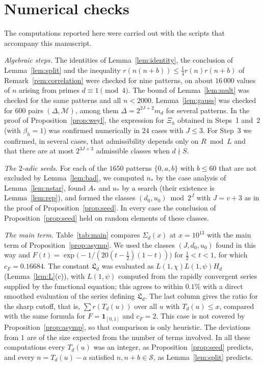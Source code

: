 \documentclass[11pt]{amsart}
\theoremstyle{remark}
\theoremstyle{definition}
\numberwithin{equation}{section}
\newcommand{\Sc}{\mathcal{S}}
\newcommand{\Lf}{\mathfrak{L}}
\begin{document}
\section{Numerical checks}\label{sec:numerics}

The computations reported here were carried out with the scripts that accompany this manuscript.

\emph{Algebraic steps.} The identities of Lemma~\ref{lem:identity}, the conclusion of Lemma~\ref{lem:split} and the inequality $r(n(n+b))\le\frac14r(n)r(n+b)$ of Remark~\ref{rem:correlation} were checked for nine patterns, on about $16\,000$ values of $n$ arising from primes $d\equiv1\pmod4$. The bound of Lemma~\ref{lem:mult} was checked for the same patterns and all $n<2000$. Lemma~\ref{lem:gauss} was checked for $600$ pairs $(\Delta,\mathcal M)$, among them $\Delta=2^{2J+2}m_d$ for several patterns. In the proof of Proposition~\ref{prop:weyl}, the expression for $\Xi_h$ obtained in Steps~1 and~2 (with $\beta_h=1$) was confirmed numerically in $24$ cases with $J\le3$. For Step~3 we confirmed, in several cases, that admissibility depends only on $R\bmod L$ and that there are at most $2^{3J+3}$ admissible classes when $d\nmid S$.

\emph{The $2$-adic seeds.} For each of the $1650$ patterns $\{0,a,b\}$ with $b\le60$ that are not excluded by Lemma~\ref{lem:bad}, we computed $n_*$ by the case analysis of Lemma~\ref{lem:nstar}, found $A_*$ and $u_*$ by a search (their existence is Lemma~\ref{lem:rep}), and formed the classes $(d_0,u_0)\bmod2^J$ with $J=v+3$ as in the proof of Proposition~\ref{prop:seed}. In every case the conclusion of Proposition~\ref{prop:seed} held on random elements of these classes.

\emph{The main term.} Table~\ref{tab:main} compares $\Sigma_d(x)$ at $x=10^{13}$ with the main term of Proposition~\ref{prop:asymp}. We used the classes $(J,d_0,u_0)$ found in this way and $F(t)=\exp\bigl(-1/(20(t-\frac12)(1-t))\bigr)$ for $\frac12<t<1$, for which $c_F=0.16684$. The constant $\Lf_d$ was evaluated as $L(1,\chi)L(1,\psi)H_d$ (Lemma~\ref{lem:L}(c)), with $L(1,\psi)$ computed from the rapidly convergent series supplied by the functional equation; this agrees to within $0.1\%$ with a direct smoothed evaluation of the series defining $\Lf_d$. The last column gives the ratio for the sharp cutoff, that is, $\sum r(T_d(u))$ over all $u$ with $T_d(u)\le x$, compared with the same formula for $F=\mathbf 1_{[0,1]}$ and $c_F=2$. This case is not covered by Proposition~\ref{prop:asymp}, so that comparison is only heuristic. The deviations from $1$ are of the size expected from the number of terms involved. In all these computations every $T_d(u)$ was an integer, as Proposition~\ref{prop:seed} predicts, and every $n=T_d(u)-a$ satisfied $n,n+b\in\Sc$, as Lemma~\ref{lem:split} predicts.
\end{document}
